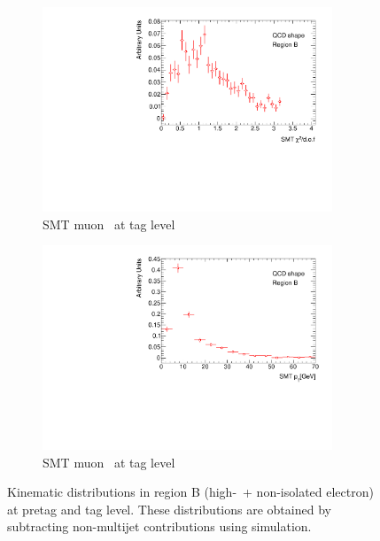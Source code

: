 \begin{figure}[htbp]
    \begin{subfigure}[b]{0.45\textwidth}
      \includegraphics[width=0.95\textwidth]{PartCrossSection/Plots/Electron/h_el_tag_SMT_chi2_wgt.pdf}
      \caption{SMT muon \xsd\ at tag level} \label{fig:CrossRegionBChi2}
    \end{subfigure}
    \;
    \begin{subfigure}[b]{0.45\textwidth}
      \includegraphics[width=0.95\textwidth]{PartCrossSection/Plots/Electron/h_el_tag_SMT_pt_wgt.pdf}
      \caption{SMT muon \pt\ at tag level} \label{fig:CrossRegionBSMTPt}
    \end{subfigure}
    \caption{Kinematic distributions in region B (high-\met\ + non-isolated electron) at pretag and tag level. These distributions are obtained by subtracting non-multijet contributions using simulation.}
  \label{fig:CrossRegionB}
\end{figure}

